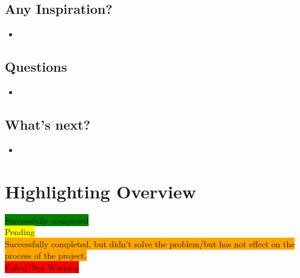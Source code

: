 \documentclass{article}
\begin{document}
\subsection{Any Inspiration?}
\begin{itemize}
\item 
\end{itemize}
\subsection{Questions}
\begin{itemize}
\item 
\end{itemize}
\subsection{What's next?}
\begin{itemize}
\item
\end{itemize}
\newpage
\fi

\section{Highlighting Overview}

\colorbox{green}{Successfully completed}\\
\colorbox{yellow}{Pending}\\
\colorbox{orange}{Successfully completed, but didn't solve the problem/but has not effect on the process of the project.}\\
\colorbox{red}{Failed/Not Working}\\
\newpage





\end{document}
